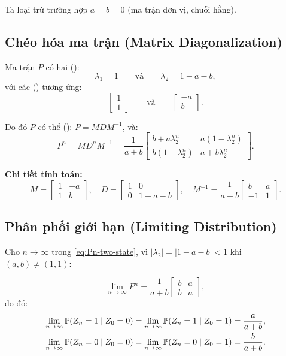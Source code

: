 Ta loại trừ trường hợp $a = b = 0$ (ma trận đơn vị, chuỗi hằng).

\subsection{Chéo hóa ma trận (Matrix Diagonalization)}

Ma trận $P$ có hai  ():
\[
  \lambda_1 = 1 \qquad \text{và} \qquad \lambda_2 = 1 - a - b,
\]
với các  () tương ứng:
\[
  \begin{bmatrix} 1 \\ 1 \end{bmatrix}
  \qquad \text{và} \qquad
  \begin{bmatrix} -a \\ b \end{bmatrix}.
\]

Do đó $P$ có thể  (): $P = M D M^{-1}$, và:
\begin{equation}\label{eq:Pn-two-state}
  P^n = M D^n M^{-1}
  = \frac{1}{a+b}
  \begin{bmatrix}
    b + a\lambda_2^n & a(1 - \lambda_2^n) \\
    b(1-\lambda_2^n) & a + b\lambda_2^n
  \end{bmatrix}.
\end{equation}

\textbf{Chi tiết tính toán:}
\[
  M = \begin{bmatrix} 1 & -a \\ 1 & b \end{bmatrix}, \quad
  D = \begin{bmatrix} 1 & 0 \\ 0 & 1-a-b \end{bmatrix}, \quad
  M^{-1} = \frac{1}{a+b}\begin{bmatrix} b & a \\ -1 & 1 \end{bmatrix}.
\]

\subsection{Phân phối giới hạn (Limiting Distribution)}

Cho $n \to \infty$ trong \eqref{eq:Pn-two-state}, vì $|\lambda_2| = |1-a-b| < 1$ khi $(a,b) \neq (1,1)$:

\begin{dinhly}
\[
  \lim_{n\to\infty} P^n = \frac{1}{a+b}
  \begin{bmatrix} b & a \\ b & a \end{bmatrix},
\]
do đó:
\begin{align}
  \lim_{n\to\infty} \mathbb{P}(Z_n = 1 \mid Z_0 = 0) &= \lim_{n\to\infty} \mathbb{P}(Z_n = 1 \mid Z_0 = 1) = \frac{a}{a+b}, \label{eq:limit-1}\\
  \lim_{n\to\infty} \mathbb{P}(Z_n = 0 \mid Z_0 = 0) &= \lim_{n\to\infty} \mathbb{P}(Z_n = 0 \mid Z_0 = 1) = \frac{b}{a+b}. \label{eq:limit-0}
\end{align}
\end{dinhly}

